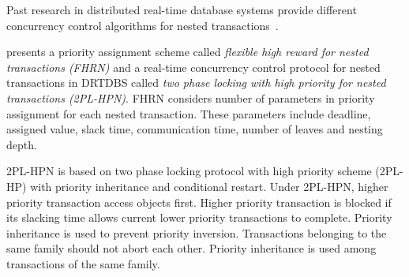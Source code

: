\documentclass[10pt, conference, compsocconf]{IEEEtran}
\begin{document}
Past research in distributed real-time database systems provide different concurrency control algorithms for nested transactions~\cite{chen2002efficient,4709120,1420972,316159}. 
\begin{comment}
Nested transactions are represented as trees. The outermost transaction is the root of the tree. Children of the root are either sub-transactions or leaf nodes. Each sub-transaction itself consists of other sub-transactions and/or leaf nodes. Data can be accessed in leaf nodes and/or sub-transactions by ``read'' and ``write'' operations. Relation between children of any node is done by AND or OR operations. AND means all children of the node must commit for their parent to commit. OR means only one child should commit for its parent to commit. \cite{chen2002efficient,4709120,1420972} are concerned with closed nesting. A parent and child transactions execute asynchronously if they both can run concurrently. Otherwise,
if the parent stops to let the child run, then this is a synchronous mode. 
\end{comment}
%
\cite{chen2002efficient} presents a priority assignment scheme called \textit{flexible high reward for nested transactions (FHRN)} and a real-time concurrency control protocol for nested transactions in DRTDBS called \textit{two phase locking with high priority for nested
transactions (2PL-HPN)}. FHRN considers number of parameters in priority assignment for each nested transaction. These parameters include deadline, assigned value, slack time, communication time, number of leaves and nesting depth.
\begin{comment}
Under FHRN, a nested transaction can be aborted by any other transaction. So, FHRN cannot bound worst case upper bound on retry cost in real-time systems. 
\end{comment}
2PL-HPN is based on two phase locking protocol with high priority scheme (2PL-HP) \textbf{\cite{Abbott:1988:SRT:44203.44209}} with priority inheritance and conditional restart. Under 2PL-HPN, higher priority transaction access objects first. Higher priority transaction is blocked if its slacking time allows current lower priority transactions to complete. Priority inheritance is used to prevent priority inversion. Transactions belonging to the same family should not abort each other. Priority inheritance is used among transactions of the same family.
\end{document}
